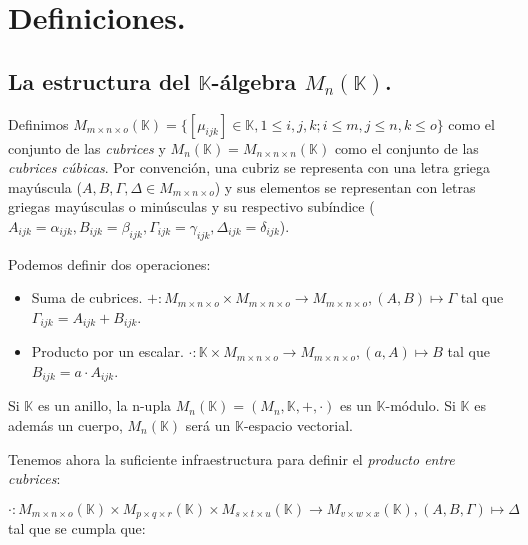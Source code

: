\section{Definiciones.}

\subsection{La estructura del $\mathbb{K}$-álgebra $M_n (\mathbb{K})$.}

Definimos $M_{m\times n\times o} (\mathbb{K}) = \{ [\mu_{ijk}] \in \mathbb{K}, 1 \le i,j,k; i \le m, j \le n, k \le o\}$ como el conjunto de las \textit{cubrices} y $M_n (\mathbb{K}) = M_{n\times n\times n} (\mathbb{K})$ como el conjunto de las \textit{cubrices cúbicas}. Por convención, una cubriz se representa con una letra griega mayúscula ($A, B, \Gamma, \Delta \in M_{m\times n\times o}$) y sus elementos se representan con letras griegas mayúsculas o minúsculas y su respectivo subíndice ($A_{ijk} = \alpha_{ijk}, B_{ijk} = \beta_{ijk}, \Gamma_{ijk} = \gamma_{ijk}, \Delta_{ijk} = \delta_{ijk}$).


Podemos definir dos operaciones:

\begin{itemize}
	\item Suma de cubrices. $+: M_{m\times n\times o} \times M_{m\times n\times o} \rightarrow M_{m\times n\times o}, (A, B) \mapsto \Gamma$ tal que $\Gamma_{ijk} = A_{ijk} + B_{ijk}$.
	\item Producto por un escalar. $\cdot: \mathbb{K} \times M_{m\times n\times o} \rightarrow M_{m\times n\times o}, (a, A) \mapsto B$ tal que $B_{ijk} = a \cdot A_{ijk}$.
\end{itemize}

Si $\mathbb{K}$ es un anillo, la n-upla $M_n (\mathbb{K}) = (M_n, \mathbb{K}, +, \cdot)$ es un $\mathbb{K}$-módulo. Si $\mathbb{K}$ es además un cuerpo, $M_n (\mathbb{K})$ será un $\mathbb{K}$-espacio vectorial.

\newpage

Tenemos ahora la suficiente infraestructura para definir el \textit{producto entre cubrices}:

$$\cdot: M_{m\times n\times o} (\mathbb{K}) \times M_{p\times q\times r} (\mathbb{K}) \times M_{s\times t\times u} (\mathbb{K}) \rightarrow M_{v\times w\times x} (\mathbb{K}), (A, B, \Gamma) \mapsto \Delta$$ tal que se cumpla que:

